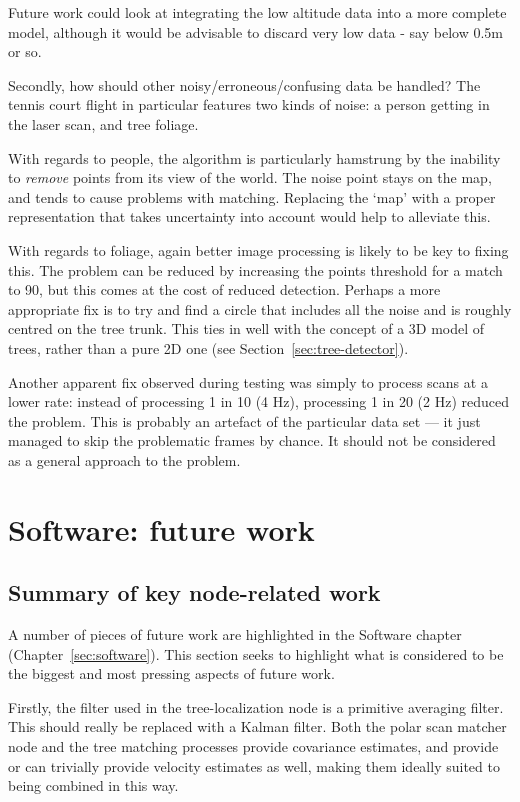 \documentclass[12pt,oneside,a4paper]{book}
\begin{document}
Future work could look at integrating the low altitude data into a
more complete model, although it would be advisable to discard very
low data - say below 0.5m or so.

Secondly, how should other noisy/erroneous/confusing data be handled? The tennis court
flight in particular features two kinds of noise: a person getting in
the laser scan, and tree foliage.

With regards to people, the algorithm is particularly hamstrung by the
inability to \emph{remove} points from its view of the world. The
noise point stays on the map, and tends to cause problems with
matching. Replacing the `map' with a proper representation that takes
uncertainty into account would help to alleviate this.

With regards to foliage, again better image processing is likely to
be key to fixing this. The problem can be reduced by increasing the
points threshold for a match to 90, but this comes at the cost of
reduced detection. Perhaps a more appropriate fix is to try and find a
circle that includes all the noise and is roughly centred on the tree
trunk. This ties in well with the concept of a 3D model of trees,
rather than a pure 2D one (see Section~\ref{sec:tree-detector}).

Another apparent fix observed during testing was simply to process
scans at a lower rate: instead of processing 1 in 10 (4 Hz),
processing 1 in 20 (2 Hz) reduced the problem. This is probably an
artefact of the particular data set --- it just managed to skip the
problematic frames by chance. It should not be considered as a
general approach to the problem.

\section{Software: future work}
\label{sec:softw-future-work}

\subsection{Summary of key node-related work}
\label{sec:summary-key-node}

A number of pieces of future work are highlighted in the Software
chapter (Chapter~\ref{sec:software}). This section seeks to highlight
what is considered to be the biggest and most pressing aspects of
future work.

Firstly, the filter used in the tree-localization node is a primitive
averaging filter. This should really be replaced with a Kalman
filter. Both the polar scan matcher node and the tree matching
processes provide covariance estimates, and provide or can trivially
provide velocity estimates as well, making them ideally suited to
being combined in this way.
\end{document}
